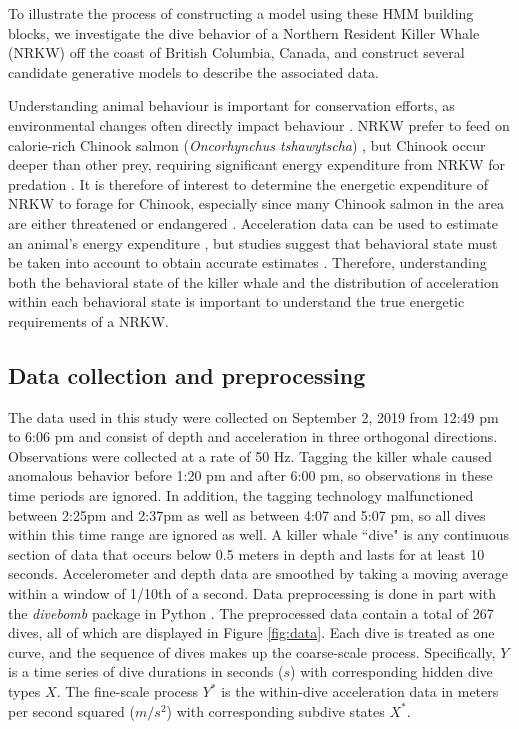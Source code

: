 

To illustrate the process of constructing a model using these HMM building blocks, we investigate the dive behavior of a Northern Resident Killer Whale (NRKW) off the coast of British Columbia, Canada, and construct several candidate generative models to describe the associated data.

Understanding animal behaviour is important for conservation efforts, as environmental changes often directly impact behaviour \citep{Sutherland:1998}. NRKW prefer to feed on calorie-rich Chinook salmon (\textit{Oncorhynchus
tshawytscha}) \citep{Ford:2006}, but Chinook occur deeper than other prey, requiring significant energy expenditure from NRKW for predation \citep{Williams:2009,Noren:2011}. It is therefore of interest to determine the energetic expenditure of NRKW to forage for Chinook, especially since many Chinook salmon in the area are either threatened or endangered \citep{Ford:2015}. Acceleration data can be used to estimate an animal's energy expenditure \citep{Green:2009,Wilson:2019}, but studies suggest that behavioral state must be taken into account to obtain accurate estimates \citep{Dot:2016}. Therefore, understanding both the behavioral state of the killer whale and the distribution of acceleration within each behavioral state is important to understand the true energetic requirements of a NRKW.

\subsection{Data collection and preprocessing}

The data used in this study were collected on September 2, 2019 from 12:49 pm to 6:06 pm and consist of depth and acceleration in three orthogonal directions. Observations were collected at a rate of 50 Hz. Tagging the killer whale caused anomalous behavior before 1:20 pm and after 6:00 pm, so observations in these time periods are ignored. In addition, the tagging technology malfunctioned between 2:25pm and 2:37pm as well as between 4:07 and 5:07 pm, so all dives within this time range are ignored as well. A killer whale ``dive" is any continuous section of data that occurs below 0.5 meters in depth and lasts for at least 10 seconds. Accelerometer and depth data are smoothed by taking a moving average within a window of 1/10th of a second. Data preprocessing is done in part with the \textit{divebomb} package in Python \citep{Nunes:2018}. The preprocessed data contain a total of 267 dives, all of which are displayed in Figure \ref{fig:data}. Each dive is treated as one curve, and the sequence of dives makes up the coarse-scale process. Specifically, $Y$ is a time series of dive durations in seconds ($s$) with corresponding hidden dive types $X$. The fine-scale process $Y^*$ is the within-dive acceleration data in meters per second squared ($m/s^2$) with corresponding subdive states $X^*$.

